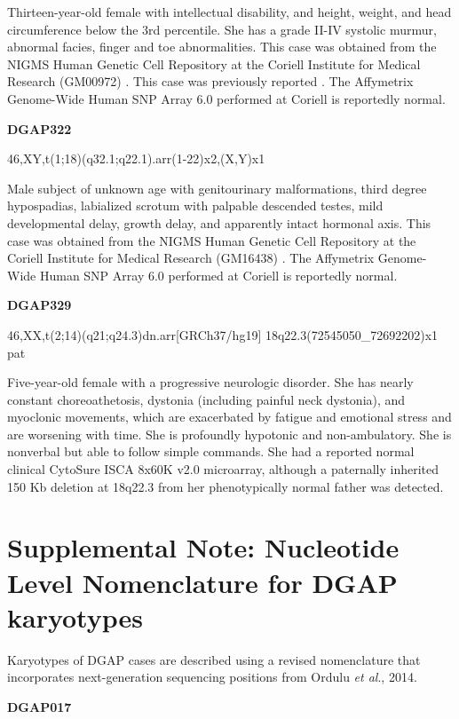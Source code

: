 \documentclass[a4paper,twoside=true,openright,parskip=full,chapterprefix=true,11pt,headings=normal,bibliography=totoc,listof=totoc,titlepage=on,captions=tableabove,draft=false]{scrreprt}
\theoremstyle{definition}
\theoremstyle{definition}
\theoremstyle{definition}
\theoremstyle{remark}
\begin{document}
Thirteen-year-old female with intellectual disability, and height,
weight, and head circumference below the 3rd percentile. She has a grade
II-IV systolic murmur, abnormal facies, finger and toe abnormalities.
This case was obtained from the NIGMS Human Genetic Cell Repository at
the Coriell Institute for Medical Research (GM00972) \citep{Tang2013}.
This case was previously reported \citep{Jenkins1975}. The Affymetrix
Genome-Wide Human SNP Array 6.0 performed at Coriell is reportedly
normal.

\textbf{DGAP322}

46,XY,t(1;18)(q32.1;q22.1).arr(1-22)x2,(X,Y)x1

Male subject of unknown age with genitourinary malformations, third
degree hypospadias, labialized scrotum with palpable descended testes,
mild developmental delay, growth delay, and apparently intact hormonal
axis. This case was obtained from the NIGMS Human Genetic Cell
Repository at the Coriell Institute for Medical Research (GM16438)
\citep{Tang2013, Frizell1998}. The Affymetrix Genome-Wide Human SNP
Array 6.0 performed at Coriell is reportedly normal.

\textbf{DGAP329}

46,XX,t(2;14)(q21;q24.3)dn.arr{[}GRCh37/hg19{]}
18q22.3(72545050\_72692202)x1 pat

Five-year-old female with a progressive neurologic disorder. She has
nearly constant choreoathetosis, dystonia (including painful neck
dystonia), and myoclonic movements, which are exacerbated by fatigue and
emotional stress and are worsening with time. She is profoundly
hypotonic and non-ambulatory. She is nonverbal but able to follow simple
commands. She had a reported normal clinical CytoSure ISCA 8x60K v2.0
microarray, although a paternally inherited 150 Kb deletion at 18q22.3
from her phenotypically normal father was detected.

\hypertarget{supplemental-note-nucleotide-level-nomenclature-for-dgap-karyotypes}{%
\section{Supplemental Note: Nucleotide Level Nomenclature for DGAP
karyotypes}\label{supplemental-note-nucleotide-level-nomenclature-for-dgap-karyotypes}}

Karyotypes of DGAP cases are described using a revised nomenclature that
incorporates next-generation sequencing positions from Ordulu \emph{et
al}., 2014.

\textbf{DGAP017}
\end{document}

